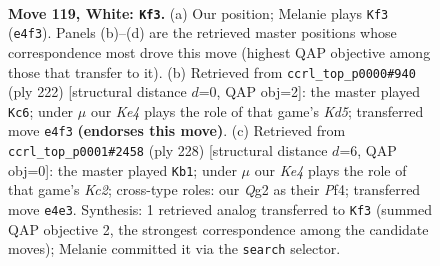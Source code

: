 \documentclass[11pt]{article}
\begin{document}
\begin{figure}[p]\centering
\begin{subfigure}{0.46\textwidth}\centering
\resizebox{\linewidth}{!}{%
\newchessgame
\chessboard[
  setfen={5k2/8/8/8/4K3/8/6Q1/8 w - - 17 119},
  showmover=false,
  pgfstyle=straightmove, color=movearrow, markmove={e4-f3}
]}
\caption{}
\end{subfigure}\hfill
\begin{subfigure}{0.46\textwidth}\centering
\resizebox{\linewidth}{!}{%
\newchessgame
\chessboard[
  setfen={k7/8/8/1Q1K4/8/8/8/8 w - - 9 112},
  showmover=false,
  pgfstyle=straightmove, color=movearrow, markmove={d5-c6}
]}
\caption{}
\end{subfigure}
\\[4pt]
\begin{subfigure}{0.46\textwidth}\centering
\resizebox{\linewidth}{!}{%
\newchessgame
\chessboard[
  setfen={8/8/8/2k5/5P2/8/2K5/8 w - - 0 115},
  showmover=false,
  pgfstyle=straightmove, color=movearrow, markmove={c2-b1}
]}
\caption{}
\end{subfigure}\hfill

\caption{\textbf{Move 119, White: \texttt{Kf3}.} (a) Our position; Melanie plays \texttt{Kf3} (\texttt{e4f3}). Panels (b)--(d) are the retrieved master positions whose correspondence most drove this move (highest QAP objective among those that transfer to it). (b) Retrieved from \texttt{ccrl\_top\_p0000\#940} (ply 222) [structural distance $d$=0, QAP obj=2]: the master played \texttt{Kc6}; under $\mu$ our \emph{Ke4} plays the role of that game's \emph{Kd5}; transferred move \texttt{e4f3} \textbf{(endorses this move)}. (c) Retrieved from \texttt{ccrl\_top\_p0001\#2458} (ply 228) [structural distance $d$=6, QAP obj=0]: the master played \texttt{Kb1}; under $\mu$ our \emph{Ke4} plays the role of that game's \emph{Kc2}; cross-type roles: our \emph{Q}g2 as their \emph{P}f4; transferred move \texttt{e4e3}. Synthesis: 1 retrieved analog transferred to \texttt{Kf3} (summed QAP objective 2, the strongest correspondence among the candidate moves); Melanie committed it via the \texttt{search} selector.}
\label{fig:thought-m236}
\end{figure}

\clearpage
\end{document}
